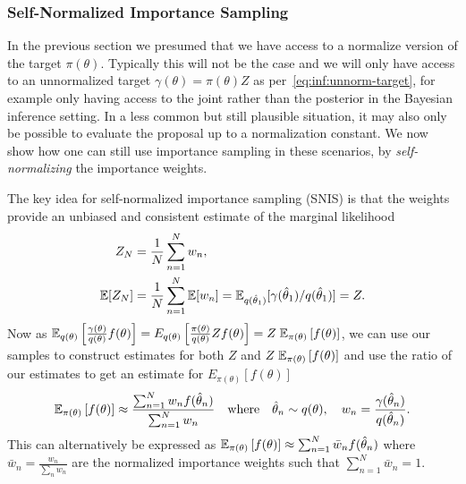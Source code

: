 
\subsubsection{Self-Normalized Importance Sampling}
\label{sec:inf:foundation:importance:self-norm}

In the previous section we presumed that we have access to a normalize version of the target
$\pi(\theta)$.  Typically this will not be the case and we will only have access to an
unnormalized target $\gamma(\theta)=\pi(\theta)Z$ as per~\eqref{eq:inf:unnorm-target},
for example only having access to the joint rather than the posterior in the Bayesian inference setting.
In a less common but still plausible situation, it may also only be possible to evaluate the proposal
up to a normalization constant.
We now show how one can still use importance sampling in these scenarios, by
\emph{self-normalizing} the importance weights.

The key idea for self-normalized importance sampling (SNIS) is that the weights provide
an unbiased and consistent estimate of the marginal likelihood
\begin{align}
Z_N &= \frac{1}{N} \sum_{n=1}^{N} w_n, \\
\mathbb{E} [Z_N] &= \frac{1}{N} \sum_{n=1}^{N} \mathbb{E}[w_n] =\mathbb{E}_{q(\hat{\theta}_1)}[\gamma(\hat{\theta}_1)/q(\hat{\theta}_1)] = Z.
\end{align}
Now as $\mathbb{E}_{q(\theta)}\left[\frac{\gamma(\theta)}{q(\theta)}f(\theta)\right]=
E_{q(\theta)}\left[\frac{\pi(\theta)}{q(\theta)} Zf(\theta)\right]=Z\;\mathbb{E}_{\pi(\theta)} \left[f(\theta)\right]$, we can 
use our samples to construct \mc estimates for both $Z$ and $Z\;\mathbb{E}_{\pi(\theta)} \left[f(\theta)\right]$ and use the ratio
of our estimates to get an estimate for $E_{\pi(\theta)} \left[f(\theta)\right]$
\begin{align}
\label{eq:inf:snis}
\mathbb{E}_{\pi(\theta)} \left[f(\theta)\right] \approx \frac{\sum_{n=1}^{N} w_n f(\hat{\theta}_n)}{\sum_{n=1}^{N} w_n}
\quad \mathrm{where} \quad \hat{\theta}_n \sim q(\theta), \quad w_n = \frac{\gamma(\hat{\theta}_n)}{q(\hat{\theta}_n)}.
\end{align} 
This can alternatively be expressed as
$\mathbb{E}_{\pi(\theta)} \left[f(\theta)\right] \approx \sum_{n=1}^{N} \bar{w}_n f(\hat{\theta}_n)$
where $\bar{w}_n = \frac{w_n}{\sum_{n} w_n}$ are the normalized importance 
weights such that $\sum_{n=1}^N\bar{w}_n = 1$.  

